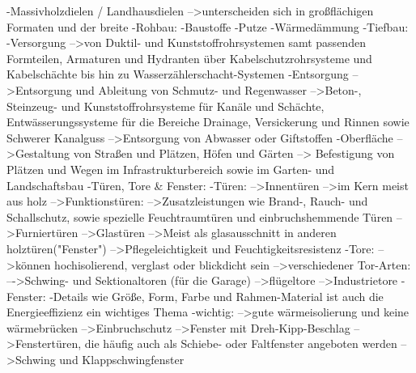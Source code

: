                      -Massivholzdielen / Landhausdielen
                            -->unterscheiden sich in großflächigen Formaten und der breite
                -Rohbau:
                    -Baustoffe
                    -Putze
                    -Wärmedämmung
                -Tiefbau:
                    -Versorgung
                        -->von Duktil- und Kunststoffrohrsystemen samt passenden Formteilen, Armaturen und Hydranten über Kabelschutzrohrsysteme und Kabelschächte bis hin zu Wasserzählerschacht-Systemen
                    -Entsorgung
                        -->Entsorgung und Ableitung von Schmutz- und Regenwasser
                            -->Beton-, Steinzeug- und Kunststoffrohrsysteme für Kanäle und Schächte, Entwässerungssysteme für die Bereiche Drainage, Versickerung und Rinnen sowie Schwerer Kanalguss
                        -->Entsorgung von Abwasser oder Giftstoffen
                    -Oberfläche
                        -->Gestaltung von Straßen und Plätzen, Höfen und Gärten
                        --> Befestigung von Plätzen und Wegen im Infrastrukturbereich sowie im Garten- und Landschaftsbau
                -Türen, Tore & Fenster:
                    -Türen:
                        -->Innentüren
                            -->im Kern meist aus holz
                            -->Funktionstüren:
                                -->Zusatzleistungen wie Brand-, Rauch- und Schallschutz,  sowie spezielle Feuchtraumtüren und einbruchshemmende Türen
                            -->Furniertüren
                            -->Glastüren
                                -->Meist als glasausschnitt in anderen holztüren("Fenster")
                                -->Pflegeleichtigkeit und Feuchtigkeitsresistenz
                    -Tore:
                        -->können hochisolierend, verglast oder blickdicht sein
                        -->verschiedener Tor-Arten:
                            –->Schwing- und Sektionaltoren (für die Garage)
                            -->flügeltore
                            -->Industrietore
                    -Fenster:
                        -Details wie Größe, Form, Farbe und Rahmen-Material ist auch die Energieeffizienz ein wichtiges Thema
                        -wichtig:
                            -->gute wärmeisolierung und keine wärmebrücken
                            -->Einbruchschutz
                        -->Fenster mit Dreh-Kipp-Beschlag
                        -->Fenstertüren, die häufig auch als Schiebe- oder Faltfenster angeboten werden
                        -->Schwing und Klappschwingfenster
